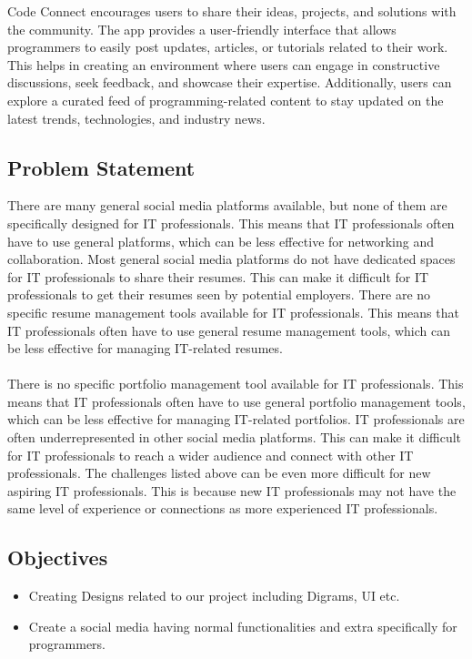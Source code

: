 \documentclass{article}
\begin{document}
 Code Connect encourages users to share their ideas, projects, and solutions with the community. The app provides a user-friendly interface that allows programmers to easily post updates, articles, or tutorials related to their work. This helps in creating an environment where users can engage in constructive discussions, seek feedback, and showcase their expertise. Additionally, users can explore a curated feed of programming-related content to stay updated on the latest trends, technologies, and industry news.
\subsection{Problem Statement}


There are many general social media platforms available, but none of them are specifically designed for IT professionals. This means that IT professionals often have to use general platforms, which can be less effective for networking and collaboration.
Most general social media platforms do not have dedicated spaces for IT professionals to share their resumes. This can make it difficult for IT professionals to get their resumes seen by potential employers.
There are no specific resume management tools available for IT professionals. This means that IT professionals often have to use general resume management tools, which can be less effective for managing IT-related resumes.\\\\
There is no specific portfolio management tool available for IT professionals. This means that IT professionals often have to use general portfolio management tools, which can be less effective for managing IT-related portfolios.
IT professionals are often underrepresented in other social media platforms. This can make it difficult for IT professionals to reach a wider audience and connect with other IT professionals.
The challenges listed above can be even more difficult for new aspiring IT professionals. This is because new IT professionals may not have the same level of experience or connections as more experienced IT professionals.\\

\subsection{Objectives}
\begin{itemize}
    \item Creating Designs related to our project including Digrams, UI etc.
    \item Create a social media having normal functionalities and extra specifically  for programmers.
\end{itemize}
\end{document}

